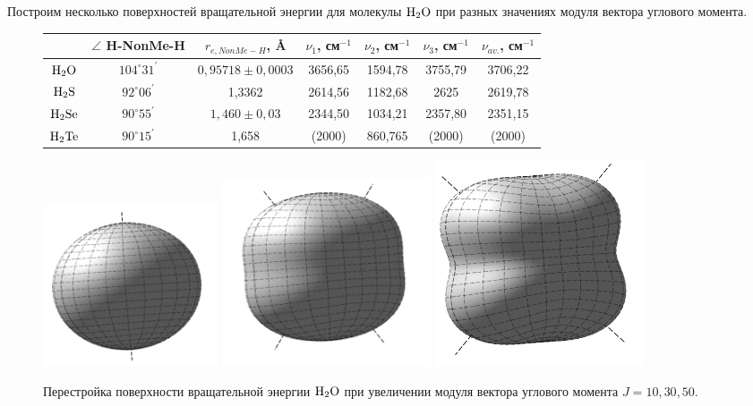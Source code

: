 Построим несколько поверхностей вращательной энергии для молекулы $\ce{H2O}$ при разных значениях модуля вектора углового момента. 
\begin{figure}[H]
\begin{tabular}{|*7{c|}}  \hline
\rule[-2ex]{0pt}{6ex} & $\angle$ H-NonMe-H & $r_{e, NonMe-H}$, \AA & $\nu_1$, см$^{-1}$ & $\nu_2$, см$^{-1}$ & $\nu_3$, см$^{-1}$ & $\nu_{av.}$, см$^{-1}$  \\ \hline
\rule[-2ex]{0pt}{6ex} $\ce{H2O}$ & $104^\circ 31^{'}$ & $0,95718 \pm 0,0003$ & 3656,65 & 1594,78 & 3755,79 & 3706,22 \\ \hline
\rule[-2ex]{0pt}{6ex} $\ce{H2S}$ & $92^\circ 06^{'}$ & 1,3362 & 2614,56 & 1182,68 & 2625 & 2619,78 \\ \hline
\rule[-2ex]{0pt}{6ex} $\ce{H2Se}$ & $90^\circ 55^{'}$ & $1,460 \pm 0,03$ & 2344,50 & 1034,21 & 2357,80 & 2351,15 \\ \hline
\rule[-2ex]{0pt}{6ex} $\ce{H2Te}$ & $90^\circ 15^{'}$ & 1,658 & (2000) & 860,765 & (2000) & (2000) \\ \hline
\end{tabular}
\end{figure}

\begin{figure}[!ht]
  \centering
	\includegraphics[width=0.25\textwidth]{../pictures/Rigid_RES_10.png}
	\includegraphics[width=0.3\textwidth]{../pictures/Rigid_RES_30.png}
	\includegraphics[width=0.3\textwidth]{../pictures/Rigid_RES_50.png}
	\caption{Перестройка поверхности вращательной энергии $\ce{H2O}$ при увеличении модуля вектора углового момента $J=10, 30, 50$.}
	\label{fig:triatomic}
\end{figure}

